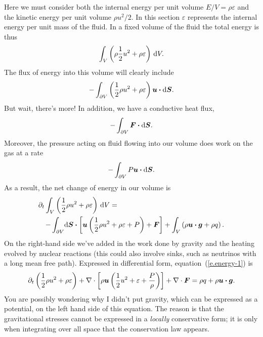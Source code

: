  Here we must consider both the internal energy per unit volume $E/V = \rho \varepsilon$ and the kinetic energy per unit volume $\rho u^{2}/2$.  In this section $\varepsilon$ represents the internal energy per unit mass of the fluid. In a fixed volume of the fluid the total energy is thus 
\[ \int_{V} \left(\rho \frac{1}{2}u^{2} + \rho \varepsilon \right)\,\mathrm{d} V. \]
The flux of energy into this volume will clearly include
\[ -\int_{\partial V}\left(\frac{1}{2}\rho u^{2} + \rho \varepsilon\right) \boldsymbol{u}\boldsymbol{\cdot}\mathrm{d}\boldsymbol{S}. \]
But wait, there's more!  In addition, we have a conductive heat flux, 
\[-\int_{\partial V}\boldsymbol{F}\boldsymbol{\cdot}\mathrm{d}\boldsymbol{S}.\] 
Moreover, the pressure acting on fluid flowing into our volume does work on the gas at a rate 
\[-\int_{\partial V}P\boldsymbol{u}\boldsymbol{\cdot}\mathrm{d}\boldsymbol{S}.\] 
As a result, the net change of energy in our volume is
\begin{eqnarray}
\lefteqn{\partial_{t}\int_{V}\left(\frac{1}{2}\rho u^{2} + \rho \varepsilon\right)\nsp\dif V = }\nonumber \\
 && -\int_{\partial V} \!\dif\bvec{S}\vdot\left[\vu\left(\frac{1}{2}\rho u^{2} + \rho \varepsilon + P\right) + \bvec{F}\right] + \int_{V} \left( \rho \vu\vdot\bvec{g} + \rho q\right).
\label{e.energy-1}
\end{eqnarray}
On the right-hand side we've added in the work done by gravity and the heating evolved by nuclear reactions (this could also involve sinks, such as neutrinos with a long mean free path).
Expressed in differential form, equation~(\ref{e.energy-1}) is
\begin{equation}\label{e.energy-2}
 \partial_{t}\left(\frac{1}{2}\rho u^{2} + \rho \varepsilon\right) 
 	+ \nabla \cdot\left[\rho\boldsymbol{u}\left(\frac{1}{2} u^{2} + \varepsilon + \frac{P}{\rho}\right)\right]
	+ \nabla \cdot\boldsymbol{F} = \rho q + \rho \boldsymbol{u}\boldsymbol{\cdot}\boldsymbol{g}.
\end{equation}
You are possibly wondering why I didn't put gravity, which can be expressed as a potential, on the left hand side of this equation.  The reason is that the gravitational stresses cannot be expressed in a  \emph{locally} conservative form; it is only when integrating over all space that the conservation law appears.

